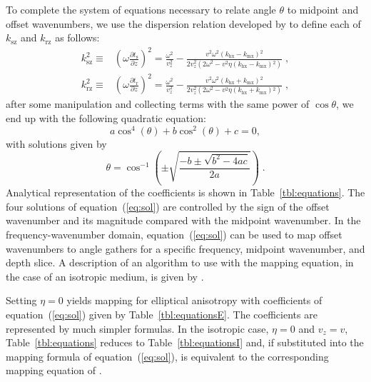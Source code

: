 To complete the system of equations necessary to relate angle $\theta$ to midpoint and offset  
wavenumbers, we use the dispersion
relation developed by \cite{GEO63-02-06230631} to define each of $k_{\text{sz}}$ and $k_{\text{rz}}$ as follows:
\begin{eqnarray}
  \label{eq:kzs}
  k_{\text{sz}}^2  \equiv & (\omega \frac{\partial t_{\text{s}}}{\partial z})^2=\frac{\omega ^2}{v_z^2}-\frac{v^2 \omega ^2
   \left(k_{\text{hx}}-k_{\text{mx}}\right){}^2}{2 v_z^2 \left(2 \omega ^2-v^2 \eta 
   \left(k_{\text{hx}}-k_{\text{mx}}\right){}^2\right)}\;,
  \\ \label{eq:kzr}
  k_{\text{rz}}^2  \equiv & (\omega \frac{\partial t_{\text{r}}}{\partial z})^2=\frac{\omega ^2}{v_z^2}-\frac{v^2 \omega ^2
   \left(k_{\text{hx}}+k_{\text{mx}}\right){}^2}{2 v_z^2 \left(2 \omega ^2-v^2 \eta 
   \left(k_{\text{hx}}+k_{\text{mx}}\right){}^2\right)}\;,
\end{eqnarray}
 after some manipulation 
and collecting terms with the same power of  $\cos \theta$, we end up with the following quadratic equation:
\begin{equation}
  \label{eq:quad}
  a \cos ^4(\theta )+b \cos ^2(\theta )+c=0,
\end{equation}
with solutions given by
\begin{equation}
 \theta =  \cos^{-1}\left(\pm \sqrt{\frac{-b\pm \sqrt{b^2-4 a
   c}}{2 a}}\right)\;.
  \label{eq:sol}
\end{equation}
Analytical representation of the coefficients is shown in
Table~\ref{tbl:equations}.  The four solutions of
equation~(\ref{eq:sol}) are controlled by the sign of the offset
wavenumber and its magnitude compared with the midpoint wavenumber.
In the frequency-wavenumber domain, equation~(\ref{eq:sol}) can be
used to map offset  wavenumbers to angle gathers for a specific
frequency, midpoint  wavenumber, and depth slice. A description of an
algorithm to use with the mapping equation, in the case of an isotropic
medium, is given by \cite{SEG-2004-10531056}.

Setting $\eta=0$ yields mapping for elliptical anisotropy with
coefficients of equation~(\ref{eq:sol}) given by
Table~\ref{tbl:equationsE}. The coefficients are represented by much
simpler formulas. In the isotropic case, $\eta=0$ and $v_z=v$,
Table~\ref{tbl:equations} reduces to Table~\ref{tbl:equationsI} and,
if substituted into the mapping formula of equation~(\ref{eq:sol}), is
equivalent to the corresponding mapping equation of
\cite{SEG-2004-10531056}.

